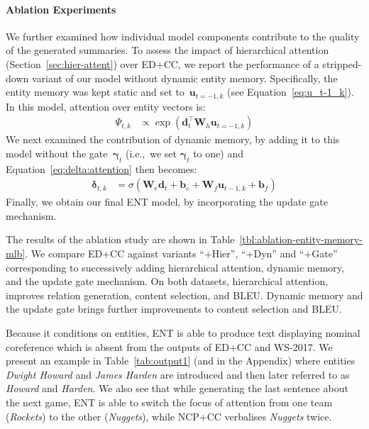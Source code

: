 \documentclass[11pt,a4paper]{article}
\begin{document}
\paragraph{Ablation Experiments} We further examined how individual
model components contribute to the quality of the generated
summaries. To assess the impact of hierarchical attention
(Section~\ref{sec:hier-attent}) over ED+CC, we report the performance
of a stripped-down variant of our model without dynamic entity memory.
Specifically, the entity memory was kept static and set
to~$\mathbf{u}_{t=-1,k}$ (see Equation~\eqref{eq:u_t-1_k}). In this
model, attention over entity vectors is:
\begin{align}
\Psi_{t,k} &\propto \exp (\mathbf{d}_t^\intercal \mathbf{W}_h \mathbf{u}_{t=-1,k}) \label{eq:psi:attention-static}
\end{align}
We next examined the contribution of dynamic memory, by adding it to
this model without the gate~$\boldsymbol{\gamma}_t$ (i.e.,~we set
$\boldsymbol{\gamma}_t$ to one) and
Equation~\eqref{eq:delta:attention} then becomes:
\begin{align}
\boldsymbol{\delta}_{t,k} &=  \sigma (\mathbf{W}_e \mathbf{d}_t + \mathbf{b}_e + \mathbf{W}_f \mathbf{u}_{t-1,k} + \mathbf{b}_f) \label{eq:upd_delta:attention}
\end{align}
Finally, we obtain our final ENT model, by incorporating the update
gate mechanism.




The results of the ablation study are shown in
Table~\ref{tbl:ablation-entity-memory-mlb}. We compare ED+CC against
variants ``+Hier'', ``+Dyn'' and ``+Gate'' corresponding
to successively adding hierarchical attention, dynamic memory, and the
update gate mechanism.  On both datasets, hierarchical attention,
improves relation generation, content selection, and BLEU. Dynamic
memory and the update gate brings further improvements to content
selection and BLEU.



Because it conditions on entities, ENT is able to produce text
displaying nominal coreference which is absent from the outputs of
ED+CC and WS-2017. We present an example in Table~\ref{tab:output1}
(and in the Appendix) where entities \textsl{Dwight
  Howard} and \textsl{James Harden} are introduced and then later
referred to as \textsl{Howard} and \textsl{Harden}.  We also see that
while generating the last sentence about the next game, ENT is able to
switch the focus of attention from one team (\textsl{Rockets}) to the
other (\textsl{Nuggets}), while NCP+CC verbalises \emph{Nuggets}
twice.
\end{document}
